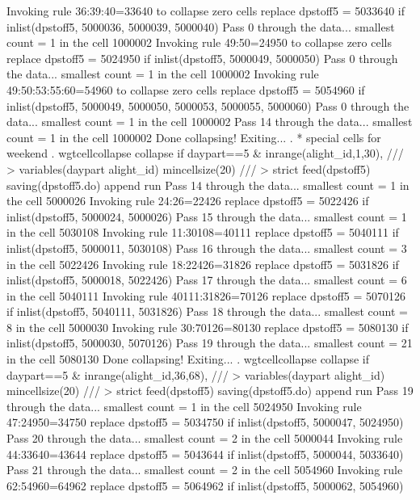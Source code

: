   Invoking rule 36:39:40=33640 to collapse zero cells
  replace dpstoff5 = 5033640 if inlist(dpstoff5, 5000036, 5000039, 5000040)
Pass 0 through the data...
  smallest count = 1 in the cell      1000002
  Invoking rule 49:50=24950 to collapse zero cells
  replace dpstoff5 = 5024950 if inlist(dpstoff5, 5000049, 5000050)
Pass 0 through the data...
  smallest count = 1 in the cell      1000002
  Invoking rule 49:50:53:55:60=54960 to collapse zero cells
  replace dpstoff5 = 5054960 if inlist(dpstoff5, 5000049, 5000050, 5000053, 5000055, 5000060)
Pass 0 through the data...
  smallest count = 1 in the cell      1000002
Pass 14 through the data...
  smallest count = 1 in the cell      1000002
  Done collapsing! Exiting...
{\smallskip}
. * special cells for weekend
. wgtcellcollapse collapse if daypart==5 \& inrange(alight_id,1,30), ///
>         variables(daypart alight_id) mincellsize(20) ///
>         strict feed(dpstoff5) saving(dpstoff5.do) append run
Pass 14 through the data...
  smallest count = 1 in the cell      5000026
  Invoking rule 24:26=22426
  replace dpstoff5 = 5022426 if inlist(dpstoff5, 5000024, 5000026)
Pass 15 through the data...
  smallest count = 1 in the cell      5030108
  Invoking rule 11:30108=40111
  replace dpstoff5 = 5040111 if inlist(dpstoff5, 5000011, 5030108)
Pass 16 through the data...
  smallest count = 3 in the cell      5022426
  Invoking rule 18:22426=31826
  replace dpstoff5 = 5031826 if inlist(dpstoff5, 5000018, 5022426)
Pass 17 through the data...
  smallest count = 6 in the cell      5040111
  Invoking rule 40111:31826=70126
  replace dpstoff5 = 5070126 if inlist(dpstoff5, 5040111, 5031826)
Pass 18 through the data...
  smallest count = 8 in the cell      5000030
  Invoking rule 30:70126=80130
  replace dpstoff5 = 5080130 if inlist(dpstoff5, 5000030, 5070126)
Pass 19 through the data...
  smallest count = 21 in the cell      5080130
  Done collapsing! Exiting...
{\smallskip}
. wgtcellcollapse collapse if daypart==5 \& inrange(alight_id,36,68), ///
>         variables(daypart alight_id) mincellsize(20) ///
>         strict feed(dpstoff5) saving(dpstoff5.do) append run
Pass 19 through the data...
  smallest count = 1 in the cell      5024950
  Invoking rule 47:24950=34750
  replace dpstoff5 = 5034750 if inlist(dpstoff5, 5000047, 5024950)
Pass 20 through the data...
  smallest count = 2 in the cell      5000044
  Invoking rule 44:33640=43644
  replace dpstoff5 = 5043644 if inlist(dpstoff5, 5000044, 5033640)
Pass 21 through the data...
  smallest count = 2 in the cell      5054960
  Invoking rule 62:54960=64962
  replace dpstoff5 = 5064962 if inlist(dpstoff5, 5000062, 5054960)
